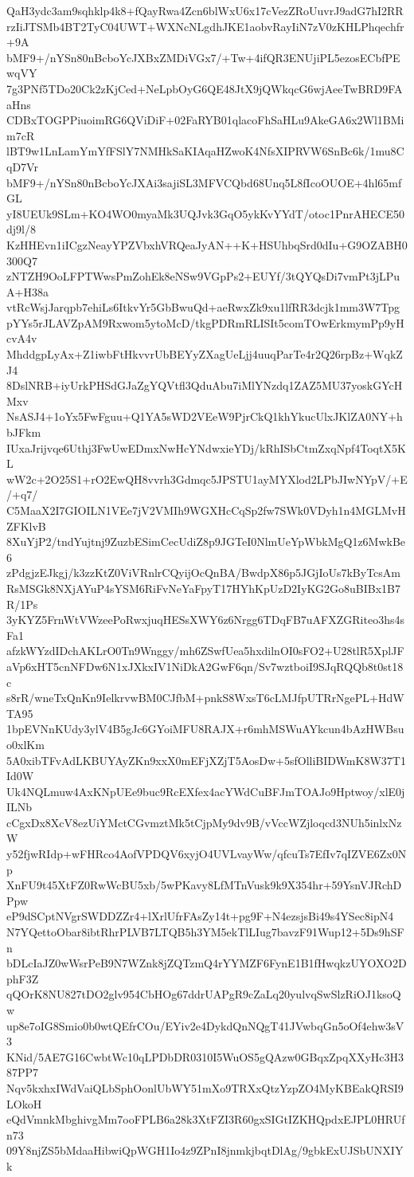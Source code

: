 QaH3ydc3am9sqhklp4k8+fQayRwa4Zcn6blWxU6x17cVezZRoUuvrJ9adG7hI2RR
rzIiJTSMb4BT2TyC04UWT+WXNcNLgdhJKE1aobvRayIiN7zV0zKHLPhqechfr+9A
bMF9+/nYSn80nBcboYcJXBxZMDiVGx7/+Tw+4ifQR3ENUjiPL5ezosECbfPEwqVY
7g3PNf5TDo20Ck2zKjCed+NeLpbOyG6QE48JtX9jQWkqcG6wjAeeTwBRD9FAaHns
CDBxTOGPPiuoimRG6QViDiF+02FaRYB01qlacoFhSaHLu9AkeGA6x2Wl1BMim7cR
lBT9w1LnLamYmYfFSlY7NMHkSaKIAqaHZwoK4NfsXIPRVW6SnBc6k/1mu8CqD7Vr
bMF9+/nYSn80nBcboYcJXAi3sajiSL3MFVCQbd68Unq5L8fIcoOUOE+4hl65mfGL
yI8UEUk9SLm+KO4WO0myaMk3UQJvk3GqO5ykKvYYdT/otoc1PnrAHECE50dj9l/8
KzHHEvn1iICgzNeayYPZVbxhVRQeaJyAN++K+HSUhbqSrd0dIu+G9OZABH0300Q7
zNTZH9OoLFPTWwsPmZohEk8eNSw9VGpPs2+EUYf/3tQYQsDi7vmPt3jLPuA+H38a
vtRcWsjJarqpb7ehiLs6ItkvYr5GbBwuQd+aeRwxZk9xu1lfRR3dcjk1mm3W7Tpg
pYYs5rJLAVZpAM9Rxwom5ytoMcD/tkgPDRmRLISIt5comTOwErkmymPp9yHcvA4v
MhddgpLyAx+Z1iwbFtHkvvrUbBEYyZXagUeLjj4uuqParTe4r2Q26rpBz+WqkZJ4
8DslNRB+iyUrkPHSdGJaZgYQVtfl3QduAbu7iMlYNzdq1ZAZ5MU37yoskGYcHMxv
NsASJ4+1oYx5FwFguu+Q1YA5sWD2VEeW9PjrCkQ1khYkucUlxJKlZA0NY+hbJFkm
IUxaJrijvqe6Uthj3FwUwEDmxNwHcYNdwxieYDj/kRhISbCtmZxqNpf4ToqtX5KL
wW2c+2O25S1+rO2EwQH8vvrh3Gdmqc5JPSTU1ayMYXlod2LPbJIwNYpV/+E/+q7/
C5MaaX2I7GIOILN1VEe7jV2VMIh9WGXHcCqSp2fw7SWk0VDyh1n4MGLMvHZFKlvB
8XuYjP2/tndYujtnj9ZuzbESimCecUdiZ8p9JGTeI0NlmUeYpWbkMgQ1z6MwkBe6
zPdgjzEJkgj/k3zzKtZ0ViVRnlrCQyijOcQnBA/BwdpX86p5JGjIoUs7kByTcsAm
RsMSGk8NXjAYuP4sYSM6RiFvNeYaFpyT17HYhKpUzD2IyKG2Go8uBIBx1B7R/1Ps
3yKYZ5FrnWtVWzeePoRwxjuqHESsXWY6z6Nrgg6TDqFB7uAFXZGRiteo3hs4sFa1
afzkWYzdIDchAKLrO0Tn9Wnggy/mh6ZSwfUea5hxdilnOI0sFO2+U28tlR5XplJF
aVp6xHT5cnNFDw6N1xJXkxIV1NiDkA2GwF6qn/Sv7wztboiI9SJqRQQb8t0st18c
s8rR/wneTxQnKn9IelkrvwBM0CJfbM+pnkS8WxsT6cLMJfpUTRrNgePL+HdWTA95
1bpEVNnKUdy3ylV4B5gJc6GYoiMFU8RAJX+r6mhMSWuAYkcun4bAzHWBsuo0xlKm
5A0xibTFvAdLKBUYAyZKn9xxX0mEFjXZjT5AosDw+5sfOlliBIDWmK8W37T1Id0W
Uk4NQLmuw4AxKNpUEe9buc9RcEXfex4acYWdCuBFJmTOAJo9Hptwoy/xlE0jILNb
cCgxDx8XcV8ezUiYMctCGvmztMk5tCjpMy9dv9B/vVccWZjloqcd3NUh5inlxNzW
y52fjwRIdp+wFHRco4AofVPDQV6xyjO4UVLvayWw/qfcuTs7EfIv7qIZVE6Zx0Np
XnFU9t45XtFZ0RwWcBU5xb/5wPKavy8LfMTnVusk9k9X354hr+59YsnVJRchDPpw
eP9dSCptNVgrSWDDZZr4+lXrlUfrFAsZy14t+pg9F+N4ezsjsBi49s4YSec8ipN4
N7YQettoObar8ibtRhrPLVB7LTQB5h3YM5ekTlLIug7bavzF91Wup12+5Ds9hSFn
bDLcIaJZ0wWsrPeB9N7WZnk8jZQTzmQ4rYYMZF6FynE1B1fHwqkzUYOXO2DphF3Z
qQOrK8NU827tDO2glv954CbHOg67ddrUAPgR9cZaLq20yulvqSwSlzRiOJ1ksoQw
up8e7oIG8Smio0b0wtQEfrCOu/EYiv2e4DykdQnNQgT41JVwbqGn5oOf4ehw3sV3
KNid/5AE7G16CwbtWc10qLPDbDR0310I5WuOS5gQAzw0GBqxZpqXXyHc3H387PP7
Nqv5kxhxIWdVaiQLbSphOonlUbWY51mXo9TRXxQtzYzpZO4MyKBEakQRSI9LOkoH
eQdVmnkMbghivgMm7ooFPLB6a28k3XtFZI3R60gxSIGtIZKHQpdxEJPL0HRUfn73
09Y8njZS5bMdaaHibwiQpWGH1Io4z9ZPnI8jnmkjbqtDlAg/9gbkExUJSbUNXIYk
